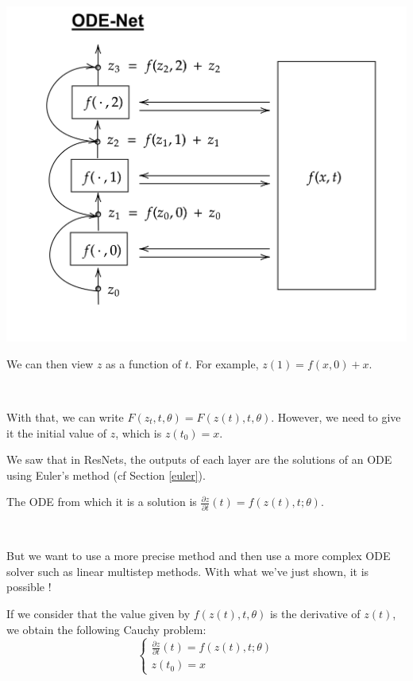 \documentclass[11pt]{beamer}
\begin{document}
\begin{frame}
\begin{center}
\includegraphics[scale=0.12]{ODENet.png}
\end{center}

We can then view $z$ as a function of $t$. For example,
$
z(1) = f(x, 0) + x.
$

~

With that, we can write $F(z_t, t, \theta) = F(z(t), t, \theta)$. However, we need to give it the initial value of $z$, which is $z(t_0) = x$.
\end{frame}

\begin{frame}
We saw that in ResNets, the outputs of each layer are the solutions of an ODE using Euler's method (cf Section \ref{euler}). 

The ODE from which it is a solution is $\frac{\partial z}{\partial t}(t) = f(z(t),t;\theta)$. 

~

But we want to use a more precise method and then use a more complex ODE solver such as linear multistep methods. With what we've just shown, it is possible !

If we consider that the value given by $f(z(t), t, \theta)$ is the derivative of $z(t)$, we obtain the following Cauchy problem:
\begin{equation}
\label{cauchypb}
\begin{cases}
\frac{\partial z}{\partial t}(t) =  f(z(t), t; \theta) \\
z(t_0) =  x
\end{cases}
\end{equation}

\end{frame}
\end{document}
